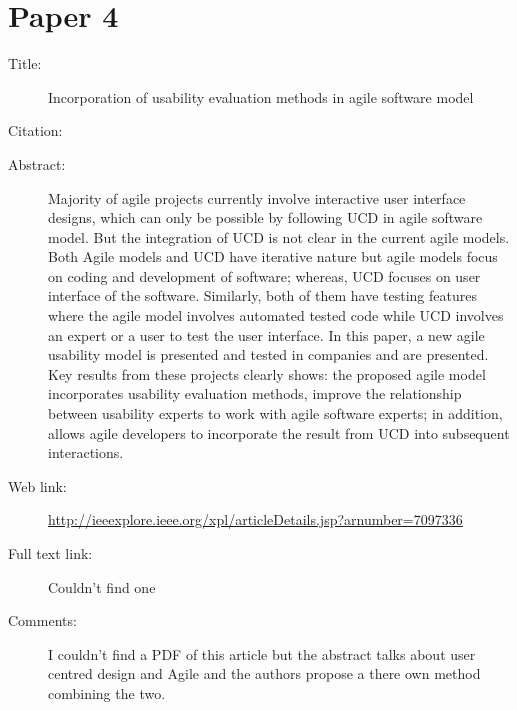 \documentclass{scrartcl}
\begin{document}
\section*{Paper 4}
\begin{description}
	\item[Title:] 	Incorporation of usability evaluation methods in agile software model	
	\item[Citation:] \cite{Butt}
	\item[Abstract:] Majority of agile projects currently involve interactive user interface designs, which can only be possible by following UCD in agile software model. But the integration of UCD is not clear in the current agile models. Both Agile models and UCD have iterative nature but agile models focus on coding and development of software; whereas, UCD focuses on user interface of the software. Similarly, both of them have testing features where the agile model involves automated tested code while UCD involves an expert or a user to test the user interface. In this paper, a new agile usability model is presented and tested in companies and are presented. Key results from these projects clearly shows: the proposed agile model incorporates usability evaluation methods, improve the relationship between usability experts to work with agile software experts; in addition, allows agile developers to incorporate the result from UCD into subsequent interactions.
	\item[Web link:] \url{http://ieeexplore.ieee.org/xpl/articleDetails.jsp?arnumber=7097336}
	\item[Full text link:] Couldn't find one
	\item[Comments:]  I couldn't find a PDF of this article but the abstract talks about user centred design and Agile and the authors propose a there own method combining the two.
\end{description}
\end{document}
